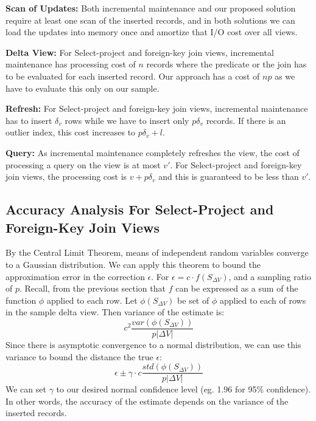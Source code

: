 \textbf{Scan of Updates: }
Both incremental maintenance and our proposed solution require at least one scan of the inserted records, and in both solutions we can
load the updates into memory once and amortize that I/O cost over all views. 

\textbf{Delta View: } For Select-project and foreign-key join views, incremental maintenance has processing cost of $n$ records where the predicate or the join has to be evaluated for each inserted record. Our approach has a cost of $np$ as we have to evaluate this only on our sample. 

\textbf{Refresh: } For Select-project and foreign-key join views, incremental maintenance has to insert $\delta_v$ rows while we have to insert only $p\delta_v$ records. If there is an outlier index, this cost increases to $p\delta_v + l$. 

\textbf{Query: } As incremental maintenance completely refreshes the view, the cost of processing a query on the view is at most $v'$. For Select-project and foreign-key join views, the processing cost is $v + p\delta_v$ and this is guaranteed to be less than $v'$. 

\subsection{Accuracy Analysis For Select-Project and Foreign-Key Join Views}
By the Central Limit Theorem, means of independent random variables converge 
to a Gaussian distribution.
We can apply this theorem to bound the approximation error in the correction $\epsilon$.
For $\epsilon = c\cdot f(S_{\Delta V})$, and a sampling ratio of $p$.
Recall, from the previous section that $f$ can be expressed as a sum of the function $\phi$ applied to each row.
Let $\phi(S_{\Delta V})$ be set of $\phi$ applied to each of rows in the sample delta view.
Then variance of the estimate is:
\[
c^2\frac{var(\phi(S_{\Delta V}))}{p|\Delta V|}
\] 
Since there is asymptotic convergence to a normal distribution, we can use this variance to bound the distance the true $\epsilon$:   
\[
\epsilon \pm \gamma \cdot c\frac{std(\phi(S_{\Delta V}))}{p|\Delta V|}
\]
We can set $\gamma$ to our desired normal confidence level (eg. 1.96 for 95\% confidence).
In other words, the accuracy of the estimate depends on the variance of the inserted records.

